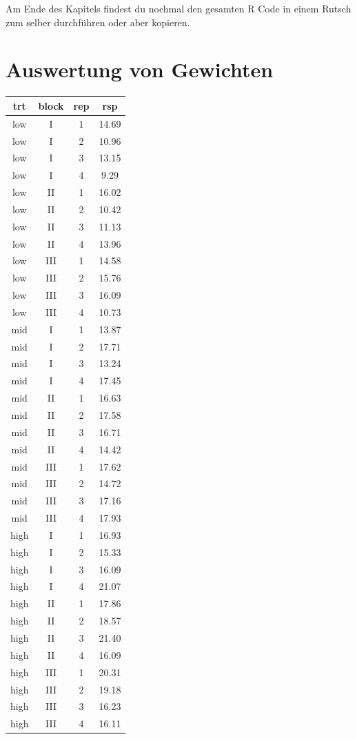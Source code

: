 \documentclass[
  letterpaper,
  DIV=11,
  oneside]{scrreport}
\begin{document}
Am Ende des Kapitels findest du nochmal den gesamten R Code in einem
Rutsch zum selber durchführen oder aber kopieren.

\hypertarget{auswertung-von-gewichten}{%
\section{Auswertung von Gewichten}\label{auswertung-von-gewichten}}

\begin{longtable}[]{@{}cccc@{}}
\toprule()
trt & block & rep & rsp \\
\midrule()
\endhead
low & I & 1 & 14.69 \\
low & I & 2 & 10.96 \\
low & I & 3 & 13.15 \\
low & I & 4 & 9.29 \\
low & II & 1 & 16.02 \\
low & II & 2 & 10.42 \\
low & II & 3 & 11.13 \\
low & II & 4 & 13.96 \\
low & III & 1 & 14.58 \\
low & III & 2 & 15.76 \\
low & III & 3 & 16.09 \\
low & III & 4 & 10.73 \\
mid & I & 1 & 13.87 \\
mid & I & 2 & 17.71 \\
mid & I & 3 & 13.24 \\
mid & I & 4 & 17.45 \\
mid & II & 1 & 16.63 \\
mid & II & 2 & 17.58 \\
mid & II & 3 & 16.71 \\
mid & II & 4 & 14.42 \\
mid & III & 1 & 17.62 \\
mid & III & 2 & 14.72 \\
mid & III & 3 & 17.16 \\
mid & III & 4 & 17.93 \\
high & I & 1 & 16.93 \\
high & I & 2 & 15.33 \\
high & I & 3 & 16.09 \\
high & I & 4 & 21.07 \\
high & II & 1 & 17.86 \\
high & II & 2 & 18.57 \\
high & II & 3 & 21.40 \\
high & II & 4 & 16.09 \\
high & III & 1 & 20.31 \\
high & III & 2 & 19.18 \\
high & III & 3 & 16.23 \\
high & III & 4 & 16.11 \\
\bottomrule()
\end{longtable}
\end{document}

